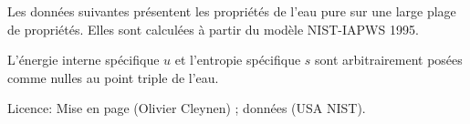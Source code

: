 Les données suivantes présentent les propriétés de l’eau pure sur une large plage de propriétés.
Elles sont calculées à partir du modèle NIST-IAPWS 1995.

L’énergie interne spécifique $u$ et l’entropie spécifique $s$
sont arbitrairement posées comme nulles au point triple de l’eau.

Licence: Mise en page \cczero (Olivier Cleynen) ; données \pd (USA NIST).
